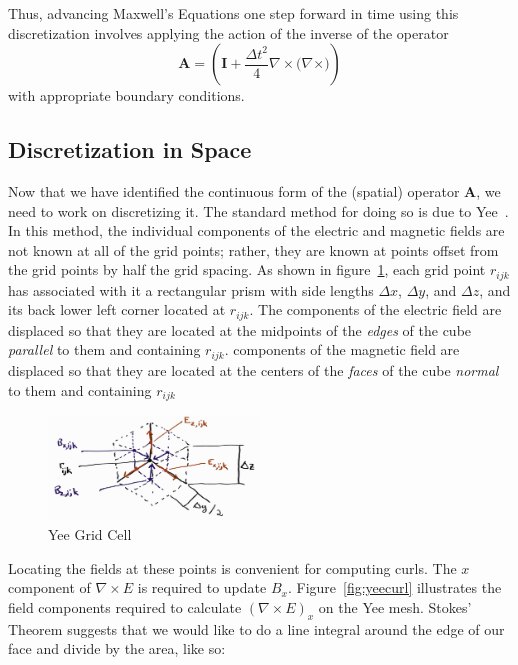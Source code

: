 \documentclass{article}
\newcommand{\curl}[1]{\nabla \times {#1}}
\newcommand{\dt}{\Delta t}
\newcommand{\iden}{\mathbf{I}}
\begin{document}
Thus, advancing Maxwell's Equations one step forward in time using
this discretization involves applying the action of the inverse of the
operator
\begin{equation}
\mathbf{A} = \left(\iden + \frac{\dt^2}{4} \curl{(\curl)} \right)
\label{eq:1}
\end{equation}
with appropriate boundary conditions.

\subsection{Discretization in Space}

Now that we have identified the continuous form of the (spatial) operator
$\mathbf{A}$, we need to work on discretizing it.
The standard method for doing so is due to
Yee~\cite{yee1966numerical}.
In this method, the individual components of the electric and magnetic
fields are not known at all of the grid points; rather, they are known
at points offset from the grid points by half the grid spacing.
As shown in figure~\ref{fig:yeecell}, each grid point $r_{ijk}$ has associated
with it a rectangular prism with side lengths $\Delta x$, $\Delta y$, and $\Delta
z$, and its back lower left corner located at $r_{ijk}$.
The components of the electric field are displaced so that they are located
at the midpoints of the {\em edges} of the cube {\em parallel} to them and
containing $r_{ijk}$.
components of the magnetic field are displaced so that they are
located at the centers of the {\em faces} of the cube {\em normal} to
them and containing $r_{ijk}$

\begin{figure}[htbp]
  \centering
  \includegraphics[width=0.5\textwidth]{YeeCellDiagram}
  \caption{Yee Grid Cell}
  \label{fig:yeecell}
\end{figure}

Locating the fields at these points is convenient for computing
curls.  The $x$ component of $\curl{E}$ is required to update $B_x$.
Figure~\ref{fig:yeecurl} illustrates the field components required to
calculate $(\curl{E})_x$ on the Yee mesh.  Stokes' Theorem suggests
that we would like to do a line integral around the edge of our face
and divide by the area, like so:
\end{document}
